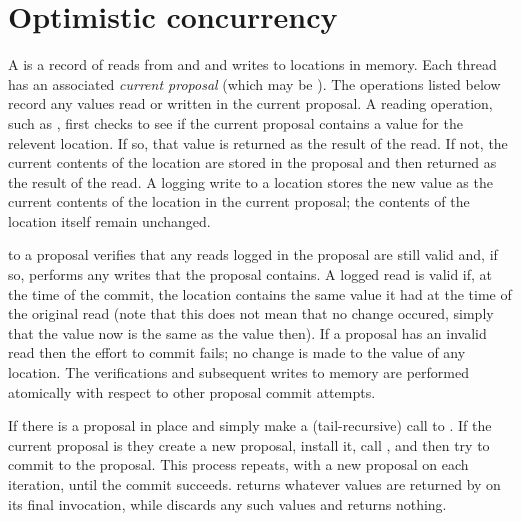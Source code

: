 \section{Optimistic concurrency}


A  is a record of reads from and and writes to locations in
 memory.  Each thread has an associated \textit{current proposal}
 (which may be ).
The  operations listed below record any values read or
 written in the current proposal.
A reading operation, such as , first checks to
 see if the current proposal contains a value for the relevent location.
If so, that value is returned as the result of the read.
If not, the current contents of the location are stored in the proposal and
 then returned as the result of the read.
A logging write to a location stores the new value as the current contents of
 the location in the current proposal; the contents of the location itself
 remain unchanged.

 to a proposal verifies that any reads logged in
 the proposal are still valid and, if so, performs any writes that
 the proposal contains.
A logged read is valid if, at the time of the commit, the location contains
 the same value it had at the time of the original read (note that this does
 not mean that no change occured, simply that the value now is the same as
 the value then).
If a proposal has an invalid read then the effort to commit fails; no change
 is made to the value of any location.
The verifications and subsequent writes to memory are performed atomically
 with respect to other proposal commit attempts.

\begin{protos}
\end{protos}
\noindent
If there is a proposal in place 
  and 
 simply make a (tail-recursive) call to .
If the current proposal is  they create a new proposal,
 install it, call , and then try to commit to the proposal.
This process repeats, with a new proposal on each iteration, until
 the commit succeeds.
 returns whatever values are returned by 
 on its final invocation, while  discards any such
 values and returns nothing.

